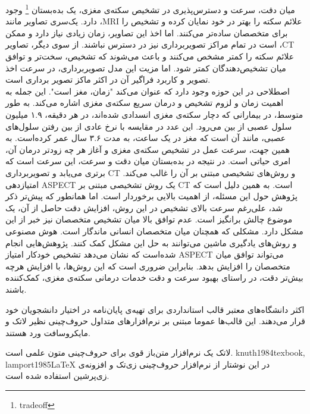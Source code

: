 میان دقت، سرعت و دسترس‌پذیری در تشخیص سکته‌ی مغزی، یک بده‌بستان
\footnote{tradeoff}
وجود دارد.
یک‌سری تصاویر مانند ،MRI علائم سکته را بهتر در خود نمایان کرده و تشخیص را برای متخصصان ساده‌تر می‌کنند.
اما اخذ این تصاویر، زمان زیادی نیاز دارد و ممکن است در تمام مراکز تصویر‌برداری نیز در دسترس نباشند.
از سوی دیگر، تصاویر ،CT علائم سکته را کمتر مشخص می‌کنند و باعث می‌شوند که تشخیص، سخت‌تر و توافق میان تشخیص‌دهندگان کمتر شود.
اما مزیت این مدل تصویربرداری، در سرعت اخذ تصویر و کاربرد فراگیر آن در اکثر ماکز تصویر برداری است.\\
اصطلاحی در این حوزه وجود دارد که عنوان می‌کند "زمان، مغز است". 
این جمله به اهمیت زمان و لزوم تشخیص و درمان سریع سکته‌ی مغزی اشاره می‌کند.
به طور متوسط، در بیمارانی که دچار سکته‌ی مغزی انسدادی شده‌اند، در هر دقیقه، ۱.۹ میلیون سلول عصبی از بین می‌رود.
این عدد در مقایسه با نرخ عادی از بین رفتن سلول‌های عصبی، مانند آن است که مغز در یک ساعت، به مدت ۳.۶ سال عمر کرده‌است.
به همین جهت، سرعت عمل در تشخیص سکته‌ی مغزی و آغاز هر چه زودتر درمان آن، امری حیاتی است.
در نتیجه در بده‌بستان میان دقت و سرعت، این سرعت است که برتری می‌یابد و تصویربرداری CT و روش‌های تشخیصی مبتنی بر آن را غالب می‌کند.
امتیازدهی ASPECT یک روش تشخیصی مبتنی بر CT است.
به همین دلیل است که پژوهش حول این مسئله، از اهمیت بالایی برخوردار است.
اما همانطور که پیش‌تر ذکر شد، علی‌رغم سرعت بالای تشخیص در این روش، افزایش دقت حاصل از آن، یک موضوع چالش برانگیز است.
عدم توافق بالا میان تشخیص متخصصان نیز خبر از این مشکل دارد.
مشکلی که همچنان میان متخصصان انسانی ماندگار است.
هوش مصنوعی و روش‌های یادگیری ماشین می‌توانند به حل این مشکل کمک کنند.
پژوهش‌هایی انجام شده‌است
که نشان می‌دهد تشخیص خودکار امتیاز ASPECT می‌تواند توافق میان متخصصان را افزایش بدهد.
بنابراین ضروری است که این روش‌ها، با افزایش هرچه بیش‌تر دقت، در راستای بهبود سرعت و دقت خدمات درمانی سکته‌ی مغزی، کمک‌کننده باشند.


اکثر دانشگاه‌های معتبر قالب استانداردی برای تهیه‌ی پایان‌نامه در اختیار دانشجویان خود قرار می‌دهند.
این قالب‌ها عموما مبتنی بر نرم‌افزارهای متداول حروف‌چینی نظیر لاتک و مایکروسافت ورد هستند.

 لاتک یک نرم‌افزار متن‌باز قوی برای حروف‌چینی متون علمی است.
 {knuth1984texbook, lamport1985LaTeX} 
در این نوشتار از نرم‌افزار حروف‌چینی زی‌تک 
 و افزونه‌ی زی‌پرشین
 استفاده شده است.


